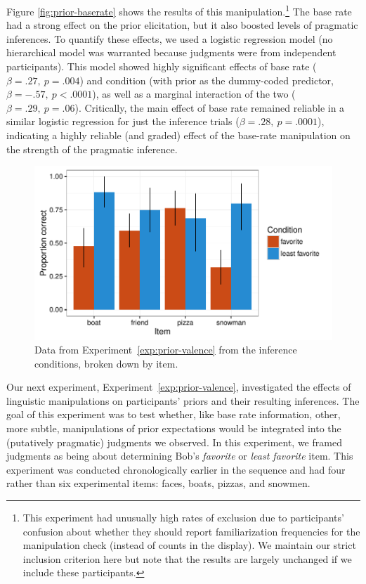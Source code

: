 \documentclass[man]{apa6}
\newcounter{Experiment}
\newcommand{\exptref}[1]{Experiment~\ref{#1}}
\begin{document}
Figure \ref{fig:prior-baserate} shows the results of this manipulation.\footnote{This experiment had unusually high rates of exclusion due to participants' confusion about whether they should report familiarization frequencies for the manipulation check (instead of counts in the display). We maintain our strict inclusion criterion here but note that the results are largely unchanged if we include these participants.}  The base rate had a strong effect on the prior elicitation, but it also boosted levels of pragmatic inferences. To quantify these effects, we used a logistic regression model (no hierarchical model was warranted because judgments were from independent participants). This model showed highly significant effects of base rate ($\beta = .27,~p = .004$) and condition (with prior as the dummy-coded predictor, $\beta = -.57,~p < .0001$), as well as a marginal interaction of the two  ($\beta = .29,~p = .06$). Critically, the main effect of base rate remained reliable in a similar logistic regression for just the inference trials ($\beta = .28,~p = .0001$), indicating a highly reliable (and graded) effect of the base-rate manipulation on the strength of the pragmatic inference.


\begin{figure}[t]
  \centering
  \includegraphics[width=6in]{../plots/2-prior-valence-items.pdf}
  \caption{\label{fig:prior-valence} Data from \exptref{exp:prior-valence} from the inference conditions, broken down by item.}
\end{figure}

Our next experiment, \exptref{exp:prior-valence}, investigated the effects of linguistic manipulations on participants' priors and their resulting inferences. The goal of this experiment was to test whether, like base rate information, other, more subtle, manipulations of prior expectations would be integrated into the (putatively pragmatic) judgments we observed. In this experiment, we framed judgments as being about determining Bob's \emph{favorite} or \emph{least favorite} item. This experiment was conducted chronologically earlier in the sequence and had four rather than six experimental items: faces, boats, pizzas, and snowmen.
\end{document}
